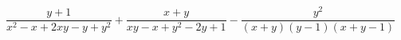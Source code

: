 \begin{ex}[type=expression]
	\begin{condition}
		 \( \dfrac{y+1}{x^2-x+2xy-y+y^2}+\dfrac{x+y}{xy-x+y^2-2y+1}-\dfrac{y^2}{(x+y)(y-1)(x+y-1)} \)
	\end{condition}
\end{ex}